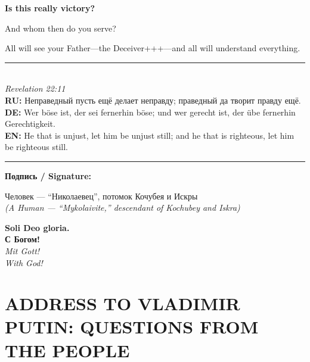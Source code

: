 \documentclass[11pt,a4paper]{article}
\theoremstyle{definition}
\theoremstyle{remark}
\begin{document}
\textbf{Is this really victory?}

And whom then do you serve?

All will see your Father—the Deceiver+++—and all will understand everything.

\vspace{1cm}

\begin{center}
\rule{0.5\textwidth}{0.4pt} \\[0.4cm]
\textit{Revelation 22:11} \\[0.3cm]
\textbf{RU:} \foreignlanguage{russian}{Неправедный пусть ещё делает неправду; 
праведный да творит правду ещё.} \\[0.2cm]
\textbf{DE:} Wer böse ist, der sei fernerhin böse; und wer gerecht ist, der übe 
fernerhin Gerechtigkeit. \\[0.2cm]
\textbf{EN:} He that is unjust, let him be unjust still; and he that is righteous, 
let him be righteous still. \\[0.4cm]
\rule{0.5\textwidth}{0.4pt}
\end{center}

\vspace{1cm}

\begin{center}
\textbf{Подпись / Signature:}

Человек — ``Николаевец'', потомок Кочубея и Искры \\
\textit{(A Human — ``Mykolaivite,'' descendant of Kochubey and Iskra)}

\vspace{0.5cm}

\textbf{Soli Deo gloria.} \\
\foreignlanguage{russian}{\textbf{С Богом!}} \\
\textit{Mit Gott!} \\
\textit{With God!}
\end{center}



\newpage
\appendix

\section{ADDRESS TO VLADIMIR PUTIN: QUESTIONS FROM THE PEOPLE}
\label{app:putin-questions}
\end{document}
